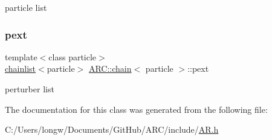 particle list 

\hypertarget{classARC_1_1chain_a6e4f41c7d3f8d44a4a01734ff4ab20cf}{}\label{classARC_1_1chain_a6e4f41c7d3f8d44a4a01734ff4ab20cf} 
\subsubsection{\texorpdfstring{pext}{pext}}
{\footnotesize\ttfamily template$<$class particle$>$ \\
\hyperlink{classARC_1_1chainlist}{chainlist}$<$particle$>$ \hyperlink{classARC_1_1chain}{A\+R\+C\+::chain}$<$ particle $>$\+::pext}



perturber list 



The documentation for this class was generated from the following file\+:\begin{DoxyCompactItemize}
\item 
C\+:/\+Users/longw/\+Documents/\+Git\+Hub/\+A\+R\+C/include/\hyperlink{AR_8h}{A\+R.\+h}\end{DoxyCompactItemize}
